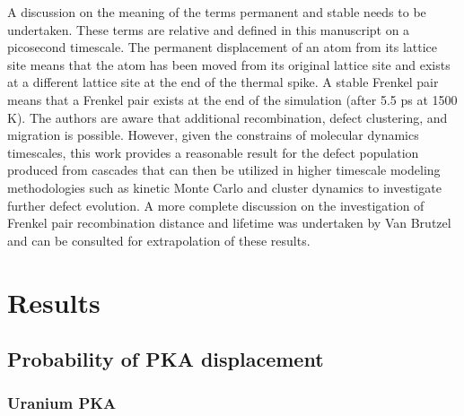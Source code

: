 \documentclass[review]{elsarticle}
\begin{document}
A discussion on the meaning of the terms permanent and stable needs to be undertaken. These terms are relative and defined in this manuscript on a picosecond timescale. The permanent displacement of an atom from its lattice site means that the atom has been moved from its original lattice site and exists at a different lattice site at the end of the thermal spike. A stable Frenkel pair means that a Frenkel pair exists at the end of the simulation (after 5.5 ps at 1500 K). The authors are aware that additional recombination, defect clustering, and migration is possible. However, given the constrains of molecular dynamics timescales, this work provides a reasonable result for the defect population produced from cascades that can then be utilized in higher timescale modeling methodologies such as kinetic Monte Carlo and cluster dynamics to investigate further defect evolution. A more complete discussion on the investigation of Frenkel pair recombination distance and lifetime was undertaken by Van Brutzel \cite{vanbrutzel2008} and can be consulted for extrapolation of these results.

\FloatBarrier

\section{Results}

\subsection{Probability of PKA displacement}\label{sect1}

\subsubsection{Uranium PKA}
\end{document}
